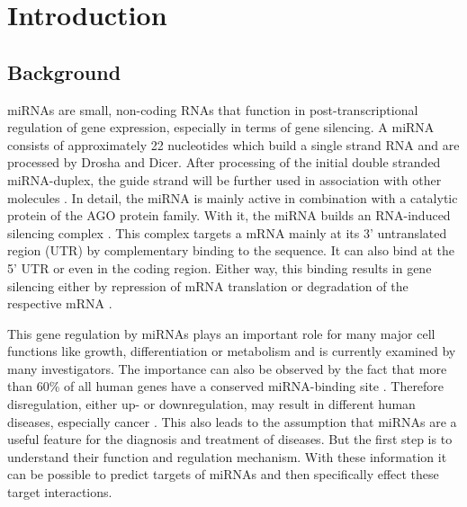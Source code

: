 \documentclass[12pt]{article}
\begin{document}
\tableofcontents

\newpage 
{}






 
\section{Introduction}
\subsection{Background}

miRNAs are small, non-coding RNAs that function in post-transcriptional regulation of gene expression, especially in terms of gene silencing. A miRNA consists of approximately 22 nucleotides which build a single strand RNA and are processed by Drosha and Dicer. After processing of the initial double stranded miRNA-duplex, the guide strand will be further used in association with other molecules \cite{Grunz}. In detail, the miRNA is mainly active in combination with a catalytic protein of the AGO protein family. With it, the miRNA builds an RNA-induced silencing complex \cite{Ha}. This complex targets a mRNA mainly at its 3' untranslated region (UTR) by complementary binding to the sequence. It can also bind at the 5' UTR or even in the coding region. Either way, this binding results in gene silencing either by repression of mRNA translation or degradation of the respective mRNA \cite{Enright}. 
  
This gene regulation by miRNAs plays an important role for many major cell functions like growth, differentiation or metabolism \cite{Ardekani} and is currently examined by many investigators. The importance can also be observed by the fact that more than 60\% of all human genes have a conserved miRNA-binding site \cite{Ha}. Therefore disregulation, either up- or downregulation, may result in different human diseases, especially cancer \cite{Ardekani}. This also leads to the assumption that miRNAs are a useful feature for the diagnosis and treatment of diseases. But the first step is to understand their function and regulation mechanism. With these information it can be possible to predict targets of miRNAs and then specifically effect these target interactions.  
\end{document}
